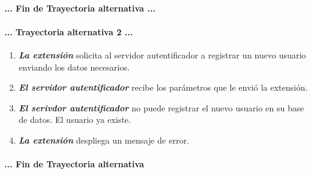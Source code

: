 \documentclass[12pt, a4paper, titlepage]{report}
\begin{document}
		\paragraph{... Fin de Trayectoria alternativa ...}
		
		\paragraph{... Trayectoria alternativa 2 ...}
		\begin{enumerate}
		    \item \textbf{\textit{La extensión}} solicita al servidor autentificador a registrar un nuevo usuario enviando los datos necesarios.
		    
		    \item \textbf{\textit{El servidor autentificador}} recibe los parámetros que le envió la extensión.
		    
		    \item \textbf{\textit{El serivdor autentificador}} no puede registrar el nuevo usuario en su base de datos. El usuario ya existe.
		    
		    \item \textbf{\textit{La extensión}} despliega un mensaje de error.
		\end{enumerate}
		\paragraph{... Fin de Trayectoria alternativa}
		
\end{document}
